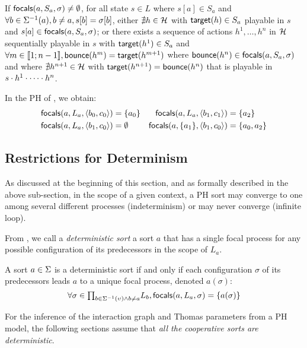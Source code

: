\begin{proposition}
\label{pps:has-focals}
If $\mathsf{focals}(a,S_a,\sigma)\neq\emptyset$, for all
state $s\in L$
where
$s[a]\in S_a$ and
$\forall b\in \Sigma^{-1}(a), b\neq a, s[b] = \sigma[b]$,
either
$\nexists h\in\mathcal{H}$ with $\mathsf{target}(h)\in S_a$  playable in $s$ and
$s[a]\in\mathsf{focals}(a,S_a,\sigma)$;
or
there exists a sequence of actions $h^1,\dots,h^n$ in $\mathcal{H}$ sequentially playable in $s$ with
$\mathsf{target}(h^1)\in S_a$ and
$\forall m\in\llbracket 1 ; n-1 \rrbracket, \mathsf{bounce}(h^m)=\mathsf{target}(h^{m+1})$
where
 $\mathsf{bounce}(h^n) \in \mathsf{focals}(a,S_a,\sigma)$
 and
 where 
$\nexists h^{n+1}\in \mathcal{H}$ with $\mathsf{target}(h^{n+1})=\mathsf{bounce}(h^n)$ 
that is playable in $s\cdot h^1\cdot \cdots \cdot h^n$.
\end{proposition}



\begin{example}
In the PH of , we obtain:
\begin{align*}
\mathsf{focals}(a,L_a,\langle b_0,c_0 \rangle) &= \{ a_0 \}
&
\mathsf{focals}(a,L_a,\langle b_1,c_1 \rangle) &= \{ a_2 \}
\\
\mathsf{focals}(a,L_a,\langle b_1,c_0 \rangle) &= \emptyset
&
\mathsf{focals}(a,\{a_1\},\langle b_1,c_0 \rangle) &= \{ a_0, a_2 \}
\end{align*}
\end{example}

\subsection{Restrictions for Determinism} %
\label{ssec:dfocals}

As discussed at the beginning of this section, and as formally described in the above sub-section, 
in the scope of a given context,
a PH sort may converge to one among several different processes (indeterminism) or may never converge
(infinite loop).

From , we call a \emph{deterministic sort}  a sort $a$
that has a single focal process for any possible configuration of its predecessors in the scope of
$L_a$.

\begin{property}\label{pro:deterministic-sort}
A sort $a\in\Sigma$ is a deterministic sort if and only if
each configuration $\sigma$ of its predecessors leads $a$ to a unique focal process,
denoted $a(\sigma)$:
\[
\forall \sigma \in {\textstyle\prod_{
b\in\Sigma^{-1}(\upsilon) \wedge b\neq a}}
L_{b},
\mathsf{focals}(a,L_a,\sigma) = \{ a(\sigma) \}\]
\end{property}


For the inference of the interaction graph and Thomas parameters from a PH model, the following
sections assume that \emph{all the cooperative sorts are deterministic}.
